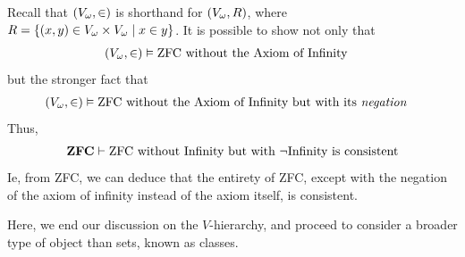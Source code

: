 \begin{remark}
    Recall that $\left( V_{\omega}, \in \right)$ is shorthand for $\left( V_{\omega}, R \right)$, where $R = \left\{ \left( x, y \right) \in V_{\omega} \times V_{\omega} \; \middle\vert \; x \in y \right\}$. It is possible to show not only that
    \begin{align*}
        \left( V_{\omega}, \in \right) &\vDash \text{ZFC without the Axiom of Infinity}
    \end{align*}
    but the stronger fact that
    \begin{align*}
        \left( V_{\omega}, \in \right) &\vDash \text{ZFC without the Axiom of Infinity but with its \textit{negation}}
    \end{align*}
    Thus,
    \begin{align*}
        \mathbf{ZFC} \vdash \text{ZFC without Infinity but with $\neg\text{Infinity}$ is consistent}
    \end{align*}
    Ie, from ZFC, we can deduce that the entirety of ZFC, except with the negation of the axiom of infinity instead of the axiom itself, is consistent.
\end{remark}

Here, we end our discussion on the $V$-hierarchy, and proceed to consider a broader type of object than sets, known as classes.
